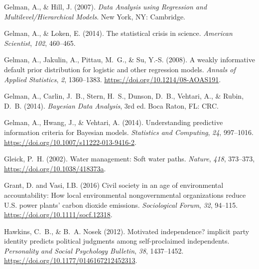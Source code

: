 \documentclass[draft,linenumbers]{agujournal}
\begin{document}
\begin{thebibliography}{33}
  Gelman, A., \& Hill, J. (2007).
  \textit{Data Analysis using Regression and Multilevel/Hierarchical Models}.
  New York, NY: Cambridge.

  Gelman, A., \& Loken, E. (2014).
  The statistical crisis in science.
  \textit{American Scientist}, \textit{102}, 460--465.

  Gelman, A., Jakulin, A., Pittau, M.~G., \& Su, Y.-S. (2008).
  A weakly informative default prior distribution for logistic and other
  regression models.
  \textit{Annals of Applied Statistics}, \textit{2}, 1360--1383.
  \url{https://doi.org/10.1214/08-AOAS191}.

  Gelman, A., Carlin, J.~B., Stern, H.~S., Dunson, D.~B., Vehtari, A., \&
  Rubin, D.~B. (2014{}).
  \textit{{B}ayesian Data Analysis}, 3rd ed.
  Boca Raton, FL: CRC.

  Gelman, A., Hwang, J., \& Vehtari, A. (2014{}).
  Understanding predictive information criteria for Bayesian models.
  \textit{Statistics and Computing}, \textit{24}, 997--1016.
  \url{https://doi.org/10.1007/s11222-013-9416-2}.

  Gleick, P.~H. (2002).
  Water management: {S}oft water paths.
  \textit{Nature},
  \textit{418}, 373--373, \url{https://doi.org/10.1038/418373a}.

  Grant, D. and Vasi, I.B. (2016)
  Civil society in an age of environmental accountability:
  How local environmental nongovernmental organizations reduce
  U.S. power plants' carbon dioxide emissions.
  \textit{Sociological Forum}, \textit{32}, 94--115.
  \url{https://doi.org/10.1111/socf.12318}.

  Hawkins, C.~B., \& B.~A. Nosek (2012).
  Motivated independence? implicit party identity predicts political judgments
  among self-proclaimed independents.
  \textit{Personality and Social Psychology Bulletin}, \textit{38}, 1437--1452.
  \url{https://doi.org/10.1177/0146167212452313}.


\end{thebibliography}
\end{document}
